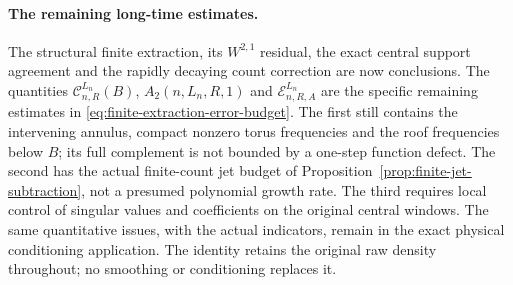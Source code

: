 \paragraph{The remaining long-time estimates.}
The structural finite extraction, its $W^{2,1}$ residual, the exact
central support agreement and the rapidly decaying count correction
are now conclusions. The quantities $\mathcal C_{n,R}^{L_n}(B)$,
$A_2(n,L_n,R,1)$ and $\mathcal E_{n,R,A}^{L_n}$ are the specific remaining
estimates in \eqref{eq:finite-extraction-error-budget}. The first still
contains the intervening annulus, compact nonzero torus frequencies and
the roof frequencies below $B$; its full complement is not bounded by a
one-step function defect. The second has the actual finite-count jet
budget of Proposition~\ref{prop:finite-jet-subtraction}, not a presumed
polynomial growth rate. The third requires local control of singular
values and coefficients on the original central windows. The same
quantitative issues, with the actual indicators, remain in the exact
physical conditioning application. The identity retains the original
raw density throughout; no smoothing or conditioning replaces it.

